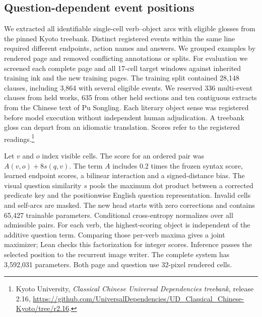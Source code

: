 \subsection*{Question-dependent event positions}
We extracted all identifiable single-cell verb--object arcs with eligible glosses from the pinned Kyoto treebank. Distinct registered events within the same line required different endpoints, action names and answers. We grouped examples by rendered page and removed conflicting annotations or splits. For evaluation we screened each complete page and all 17-cell target windows against inherited training ink and the new training pages. The training split contained 28,148 clauses, including 3,864 with several eligible events. We reserved 336 multi-event clauses from held works, 635 from other held sections and ten contiguous extracts from the Chinese text of Pu Songling. Each literary object sense was registered before model execution without independent human adjudication. A treebank gloss can depart from an idiomatic translation. Scores refer to the registered readings.\footnote{Kyoto University, \textit{Classical Chinese Universal Dependencies treebank}, release 2.16, \url{https://github.com/UniversalDependencies/UD_Classical_Chinese-Kyoto/tree/r2.16}.}

Let $v$ and $o$ index visible cells. The score for an ordered pair was $A(v,o)+8s(q,v)$. The term $A$ includes 0.2 times the frozen syntax score, learned endpoint scores, a bilinear interaction and a signed-distance bias. The visual question similarity $s$ pools the maximum dot product between a corrected predicate key and the positionwise English question representation. Invalid cells and self-arcs are masked. The new head starts with zero corrections and contains 65,427 trainable parameters. Conditional cross-entropy normalizes over all admissible pairs. For each verb, the highest-scoring object is independent of the additive question term. Comparing those per-verb maxima gives a joint maximizer; Lean checks this factorization for integer scores. Inference passes the selected position to the recurrent image writer. The complete system has 3,592,031 parameters. Both page and question use 32-pixel rendered cells.

